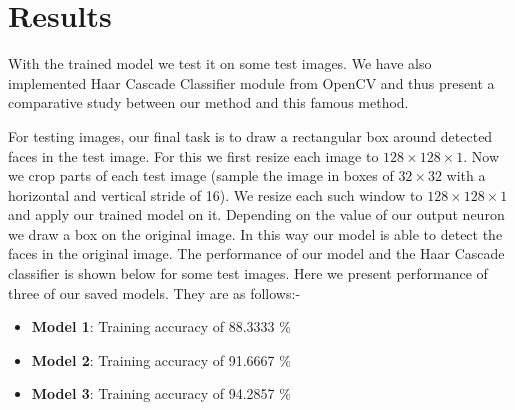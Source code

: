 \documentclass{article}
\begin{document}
\section{Results}
With the trained model we test it on some test images. We have also implemented Haar Cascade Classifier module from OpenCV and thus present a comparative study between our method and this famous method.\par
For testing images, our final task is to draw a rectangular box around detected faces in the test image. For this we first resize each image to $128\times128\times1$. Now we crop parts of each test image (sample the image in boxes of $32\times32$ with a horizontal and vertical stride of 16). We resize each such window to $128\times128\times1$ and apply our trained model on it. Depending on the value of our output neuron we draw a box on the original image. In this way our model is able to detect the faces in the original image. The performance of our model and the Haar Cascade classifier is shown below for some test images. Here we present performance of three of our saved models. They are as follows:-
\begin{itemize}
\item \textbf{Model 1}: Training accuracy of 88.3333 \%
    \item \textbf{Model 2}: Training accuracy of 91.6667 \%
\item \textbf{Model 3}: Training accuracy of 94.2857 \%
\end{itemize}
\end{document}
